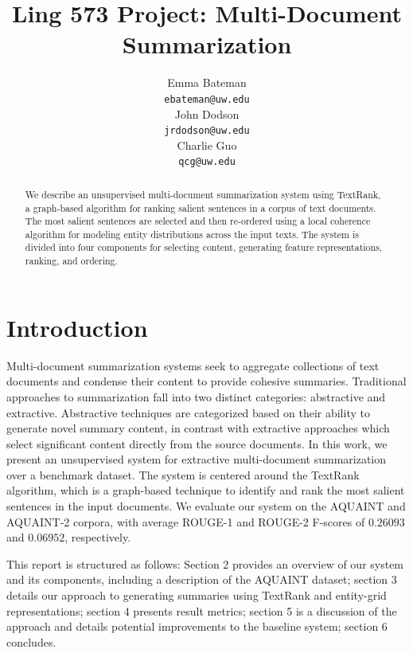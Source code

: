 \documentclass[11pt]{article}
\title{Ling 573 Project: Multi-Document Summarization}
\author{Emma Bateman \\
  {\tt ebateman@uw.edu} \\\And
  John Dodson \\
  {\tt jrdodson@uw.edu} \\\And
  Charlie Guo \\
  {\tt qcg@uw.edu}
  }
\date{}
\begin{document}
\maketitle
\begin{abstract}
We describe an unsupervised multi-document summarization system using TextRank, a graph-based algorithm for ranking salient sentences in a corpus of text documents. The most salient sentences are selected and then re-ordered using a local coherence algorithm for modeling entity distributions across the input texts. The system is divided into four components for selecting content, generating feature representations, ranking, and ordering.
\end{abstract}

\section{Introduction}

Multi-document summarization systems seek to aggregate collections of text documents and condense their content to provide cohesive summaries. Traditional approaches to summarization fall into two distinct categories: abstractive and extractive. Abstractive techniques are categorized based on their ability to generate novel summary content, in contrast with extractive approaches which select significant content directly from the source documents. In this work, we present an unsupervised system for extractive multi-document summarization over a benchmark dataset. The system is centered around the TextRank algorithm, which is a graph-based technique to identify and rank the most salient sentences in the input documents. We evaluate our system on the AQUAINT and AQUAINT-2 corpora, with average ROUGE-1 and ROUGE-2 F-scores of $0.26093$ and $0.06952$, respectively. 

This report is structured as follows: Section 2 provides an overview of our system and its components, including a description of the AQUAINT dataset; section 3 details our approach to generating summaries using TextRank and entity-grid representations; section 4 presents result metrics; section 5 is a discussion of the approach and details potential improvements to the baseline system; section 6 concludes.
\end{document}
